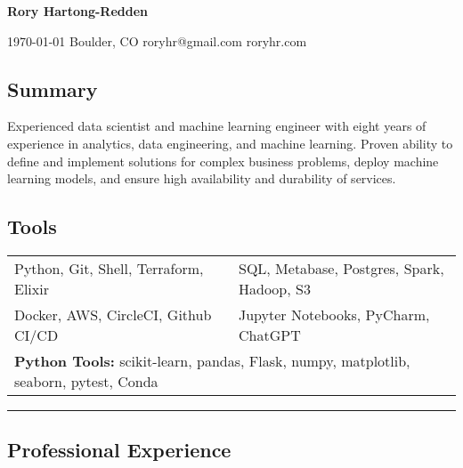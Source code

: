 \documentclass[10pt,letterpaper]{article}
\newenvironment{indentsection}[1]
{\begin{list}{}%
	{\setlength{\leftmargin}{#1}}
	\item[]%
}
{\end{list}}
\begin{document}
{\raggedright \LARGE \bf Rory Hartong-Redden}

{\raggedleft 
\today \/ \textbar
\/ Boulder, CO \textbar
\/ roryhr@gmail.com \textbar
\/ roryhr.com
\\
}

\subsection*{Summary}
\begin{centering}  
Experienced data scientist and machine learning engineer with eight years of experience in analytics, data engineering, and machine learning. Proven ability to define and implement solutions for complex business problems, deploy machine learning models, and ensure high availability and durability of services.
\end{centering}

\subsection*{Tools}
\begin{indentsection}{\parindent}
\begin{tabular}{p{0.5\linewidth}   p{0.5\linewidth}} 
	Python, Git, Shell, Terraform, Elixir
	& SQL, Metabase, Postgres, Spark, Hadoop, S3 \\

	Docker, AWS, CircleCI, Github CI/CD
	& Jupyter Notebooks, PyCharm, ChatGPT\\ 
	
	\multicolumn{2}{l}{
		\textbf{Python Tools:} scikit-learn, pandas, Flask, numpy, matplotlib, seaborn, pytest, Conda
		}
\end{tabular}
\end{indentsection}

\hrule
\subsection*{Professional Experience}
\end{document}
